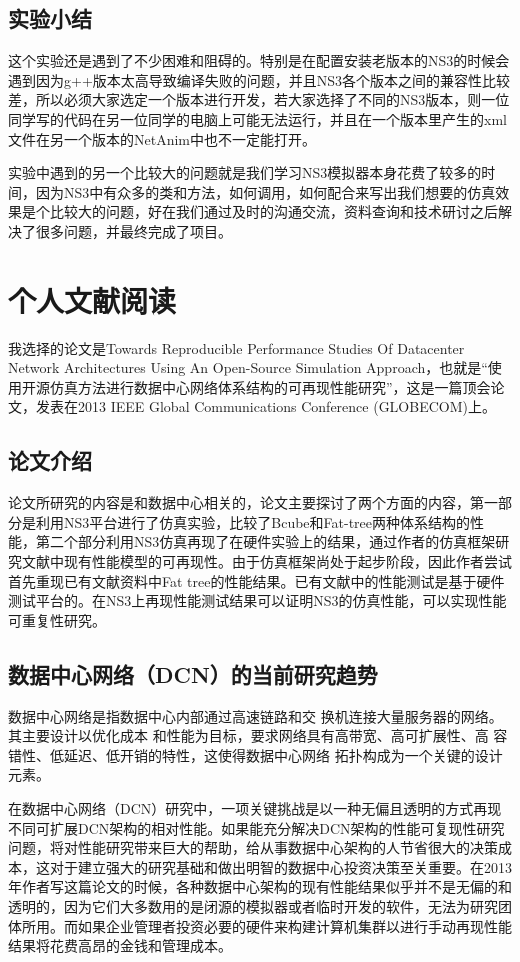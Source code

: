 \documentclass[lang=cn,11pt,a4paper,cite=authoryear]{elegantpaper}
\begin{document}
\subsection{实验小结}

这个实验还是遇到了不少困难和阻碍的。特别是在配置安装老版本的NS3的时候会遇到因为g++版本太高导致编译失败的问题，并且NS3各个版本之间的兼容性比较差，所以必须大家选定一个版本进行开发，若大家选择了不同的NS3版本，则一位同学写的代码在另一位同学的电脑上可能无法运行，并且在一个版本里产生的xml文件在另一个版本的NetAnim中也不一定能打开。

实验中遇到的另一个比较大的问题就是我们学习NS3模拟器本身花费了较多的时间，因为NS3中有众多的类和方法，如何调用，如何配合来写出我们想要的仿真效果是个比较大的问题，好在我们通过及时的沟通交流，资料查询和技术研讨之后解决了很多问题，并最终完成了项目。

\section{个人文献阅读}

我选择的论文是Towards Reproducible Performance Studies Of Datacenter Network Architectures Using An Open-Source Simulation Approach，也就是“使用开源仿真方法进行数据中心网络体系结构的可再现性能研究”，这是一篇顶会论文，发表在2013 IEEE Global Communications Conference (GLOBECOM)上。
\subsection{论文介绍}

论文所研究的内容是和数据中心相关的，论文主要探讨了两个方面的内容，第一部分是利用NS3平台进行了仿真实验，比较了Bcube和Fat-tree两种体系结构的性能，第二个部分利用NS3仿真再现了在硬件实验上的结果，通过作者的仿真框架研究文献中现有性能模型的可再现性。由于仿真框架尚处于起步阶段，因此作者尝试首先重现已有文献资料中Fat tree的性能结果。已有文献中的性能测试是基于硬件测试平台的。在NS3上再现性能测试结果可以证明NS3的仿真性能，可以实现性能可重复性研究。

\subsection{数据中心网络（DCN）的当前研究趋势}

数据中心网络是指数据中心内部通过高速链路和交
换机连接大量服务器的网络。其主要设计以优化成本
和性能为目标，要求网络具有高带宽、高可扩展性、高
容错性、低延迟、低开销的特性，这使得数据中心网络
拓扑构成为一个关键的设计元素。

在数据中心网络（DCN）研究中，一项关键挑战是以一种无偏且透明的方式再现不同可扩展DCN架构的相对性能。如果能充分解决DCN架构的性能可复现性研究问题，将对性能研究带来巨大的帮助，给从事数据中心架构的人节省很大的决策成本，这对于建立强大的研究基础和做出明智的数据中心投资决策至关重要。在2013年作者写这篇论文的时候，各种数据中心架构的现有性能结果似乎并不是无偏的和透明的，因为它们大多数用的是闭源的模拟器或者临时开发的软件，无法为研究团体所用。而如果企业管理者投资必要的硬件来构建计算机集群以进行手动再现性能结果将花费高昂的金钱和管理成本。
\end{document}
